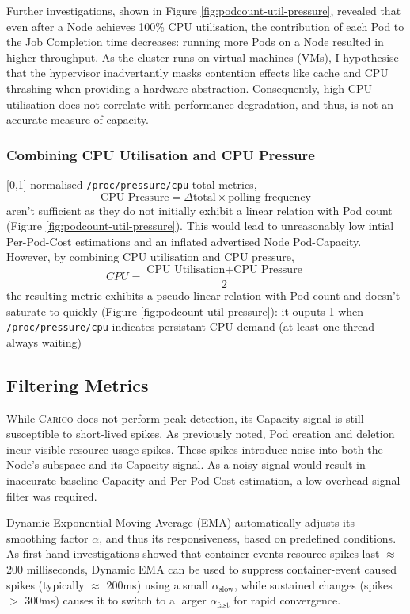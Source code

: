 Further investigations, shown in Figure \ref{fig:podcount-util-pressure},
revealed that even after a Node achieves 100\% CPU utilisation, the contribution
of each Pod to the Job Completion time decreases: running more Pods on a Node
resulted in higher throughput. As the cluster runs on virtual machines (VMs), I
hypothesise that the hypervisor inadvertantly masks contention effects like
cache and CPU thrashing when providing a hardware abstraction. Consequently,
high CPU utilisation does not correlate with performance degradation, and thus,
is not an accurate measure of capacity.

\subsubsection{Combining CPU Utilisation and CPU Pressure}
[0,1]-normalised \verb|/proc/pressure/cpu| total metrics,
\[ \text{CPU Pressure} = \Delta \text{total} \times \text{polling frequency} \]
aren't sufficient as they do not initially exhibit a linear relation with Pod
count (Figure \ref{fig:podcount-util-pressure}). This would lead to
unreasonably low intial Per-Pod-Cost estimations and an inflated advertised Node
Pod-Capacity. However, by combining CPU utilisation and CPU pressure,
\[ CPU = \frac{\text{CPU Utilisation} + \text{CPU Pressure}}{2} \]
the resulting metric exhibits a pseudo-linear relation with Pod count and
doesn't saturate to quickly (Figure \ref{fig:podcount-util-pressure}): it ouputs
1 when \verb|/proc/pressure/cpu| indicates persistant CPU demand (at least one
thread always waiting)

\subsection{Filtering Metrics}
While \textsc{Carico} does not perform peak detection, its Capacity signal is
still susceptible to short-lived spikes. As previously noted,  Pod creation and
deletion incur visible resource usage spikes. These spikes introduce noise into
both the Node's subspace and its Capacity signal. As a noisy signal
would result in inaccurate baseline Capacity and Per-Pod-Cost estimation, a
low-overhead signal filter was required.

Dynamic Exponential Moving Average (EMA) automatically adjusts its smoothing
factor $\alpha$, and thus its responsiveness, based on predefined conditions.
As first-hand investigations showed that container events resource spikes last
$\approx$200 milliseconds, Dynamic EMA can be used to
suppress container-event caused spikes (typically $\approx$ 200ms) using a small
$\alpha_{\text{slow}}$, while sustained changes (spikes $>$ 300ms) causes it to
switch to a larger $\alpha_{\text{fast}}$ for rapid convergence.

